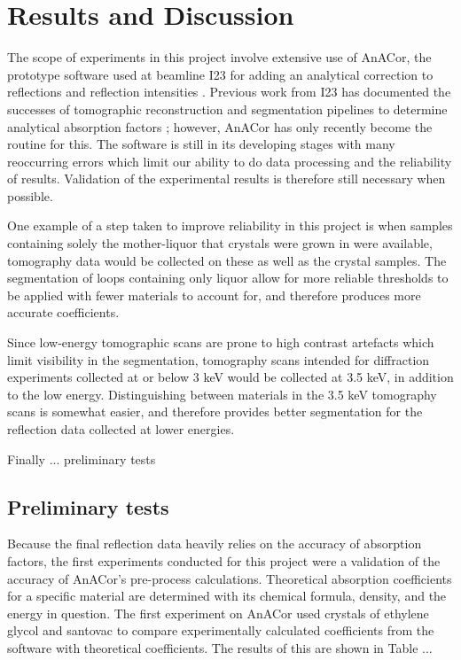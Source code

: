 \section{Results and Discussion}

The scope of experiments in this project involve extensive use of AnACor, the prototype software used at beamline I23 for adding an analytical correction to reflections and reflection intensities \cite{Lu}. Previous work from I23 has documented the successes of tomographic reconstruction and segmentation pipelines to determine analytical absorption factors \cite{Kazantsev2021}; however, AnACor has only recently become the routine for this. The software is still in its developing stages with many reoccurring errors which limit our ability to do data processing and the reliability of results. Validation of the experimental results is therefore still necessary when possible.

One example of a step taken to improve reliability in this project is when samples containing solely the mother-liquor that crystals were grown in were available, tomography data would be collected on these as well as the crystal samples. The segmentation of loops containing only liquor allow for more reliable thresholds to be applied with fewer materials to account for, and therefore produces more accurate coefficients.

Since low-energy tomographic scans are prone to high contrast artefacts which limit visibility in the segmentation, tomography scans intended for diffraction experiments collected at or below 3 keV would be collected at 3.5 keV, in addition to the low energy. Distinguishing between materials in the 3.5 keV tomography scans is somewhat easier, and therefore provides better segmentation for the reflection data collected at lower energies.

Finally ... preliminary tests

\subsection{Preliminary tests}

Because the final reflection data heavily relies on the accuracy of absorption factors, the first experiments conducted for this project were a validation of the accuracy of AnACor's pre-process calculations. Theoretical absorption coefficients for a specific material are determined with its chemical formula, density, and the energy in question. The first experiment on AnACor used crystals of ethylene glycol and santovac to compare experimentally calculated coefficients from the software with theoretical coefficients. The results of this are shown in Table ...

